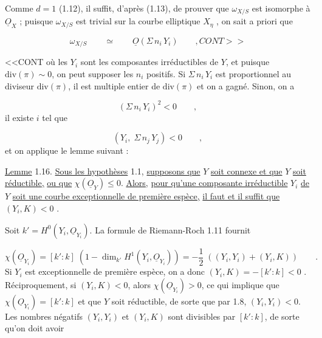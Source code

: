 Comme $d = 1$ (1.12), il suffit, d'après (1.13), de prouver que $\omega_{X/S}$ est isomorphe à $\underline{O}_X$ ; puisque $\omega_{X/S}$ est trivial sur la courbe elliptique $X_\eta$ , on sait a priori que

\begin{equation*}
\omega_{X/S} \qquad \simeq \qquad \underline{O}(\Sigma \, n_i \, Y_i) \qquad , CONT>>
\end{equation*}


<<CONT où les $Y_i$ sont les composantes irréductibles de $Y$, et puisque $\mathrm{div}(\pi) \sim 0$, on peut supposer les $n_i$ positifs. Si $\Sigma \, n_i \, Y_i$ est proportionnel au diviseur $\mathrm{div}(\pi)$, il est multiple entier de $\mathrm{div}(\pi)$ et on a gagné. Sinon, on a

\begin{equation*}
(\Sigma \, n_i \, Y_i)^2 < 0 \qquad ,
\end{equation*}
il existe $i$ tel que

\begin{equation*}
(Y_i, \; \Sigma \, n_j \, Y_j) < 0 \qquad ,
\end{equation*}
et on applique le lemme suivant :

\underline{Lemme} 1.16. \underline{Sous les hypothèses} 1.1, \underline{supposons que} $Y$ \underline{soit connexe et que} $Y$ \underline{soit réductible,} \underline{ou que} $\chi(\underline{O}_Y) \leq 0$. \underline{Alors,} \underline{pour qu'une composante irréductible} $Y_i$ \underline{de} $Y$ \underline{soit une courbe exceptionnelle de première espèce,} \underline{il faut et il suffit que} $(Y_i,K) < 0$ .

Soit $k' = H^0(Y_i,\underline{O}_{Y_i})$. La formule de Riemann-Roch 1.11 fournit

\begin{equation*}
\chi(\underline{O}_{Y_i}) = [k':k] \; (1-\dim_{k'} H^1(Y_i,\underline{O}_{Y_i})) = - \frac{1}{2} \; ((Y_i,Y_i) + (Y_i,K)) \qquad .
\end{equation*}
Si $Y_i$ est exceptionnelle de première espèce, on a donc $(Y_i,K) = -[k':k] < 0$ . Réciproquement, si $(Y_i,K) < 0$, alors $\chi(\underline{O}_{Y_i}) > 0$, ce qui implique que $\chi(\underline{O}_{Y_i}) = [k':k]$ et que $Y$ soit réductible, de sorte que par 1.8, $(Y_i,Y_i) < 0$. Les nombres négatifs $(Y_i,Y_i)$ et $(Y_i,K)$ sont divisibles par $[k':k]$, de sorte qu'on doit avoir

